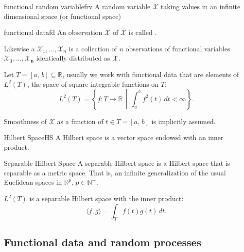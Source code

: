 \begin{definition}{functional random variable}{frv}
	A random variable $\boldsymbol{\mathcal X}$ taking values in an infinite dimensional space (or
	functional space)
\end{definition}

\begin{definition}{functional data}{fd}
	An observation $\mathcal X$ of $\boldsymbol{\mathcal X}$ is called .
	\tcblower

	Likewise a  $\mathcal X_1,\ldots,\mathcal X_n$ is a collection of $n$
	observations of functional variables $\boldsymbol{\mathcal X_1}, \ldots, \boldsymbol{\mathcal X_n}$
	identically distributed as $\boldsymbol{\mathcal X}$.
\end{definition}

Let $T = [a,\,b] \subseteq \mathds R$, usually we work with functional data that are
elements of $L^2(T)$, the space of square integrable functions on $T$:
\begin{equation*}
	L^2(T) = \left\{ f : T \to \mathds R \,\middle|\, \int_a^b f^2(t) \,dt < \infty \right\}.
\end{equation*}

Smoothness of $\mathcal X$ as a function of $t \in T = [a,\, b]$ is implicitly assumed.

\begin{definition*}{Hilbert Space}{HS}
	A Hilbert space is a vector space endowed with an inner product.
\end{definition*}

\begin{definition}{Separable Hilbert Space}{}
	A separable Hilbert space is a Hilbert space that is separable as a metric space. That is,
	an infinite generalization of the usual Euclidean spaces in $\mathds R^p,\,p\in\mathds N^+$.
	\tcblower
	\begin{note}
		$L^2(T)$ is a separable Hilbert space with the inner product:
		\begin{equation*}
			\langle f, g \rangle = \int_T f(t) g(t) \,dt.
		\end{equation*}
	\end{note}
\end{definition}

\pagebreak
\subsection{Functional data and random processes}

